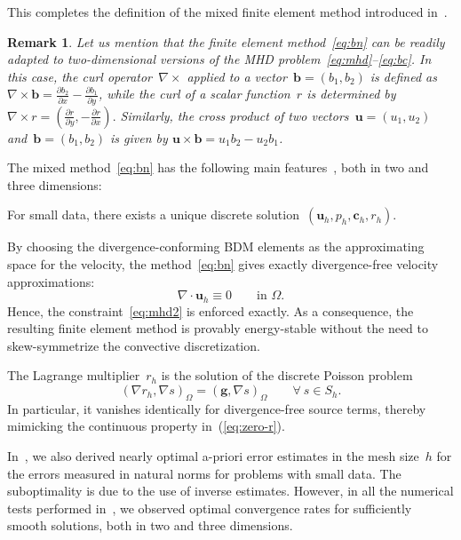 \documentclass{siamltex}
\newcounter{bean}
\newenvironment{romenum}{\begin{list}{{(\roman{bean})}}
{\usecounter{bean}}}{\end{list}}
\newtheorem{remark}[theorem]{Remark}
\newcommand{\uu}[1]{\boldsymbol #1}                     %
\begin{document}
This completes the definition of the mixed finite element method introduced in~\cite{Greif10}.

\begin{remark}
\label{remark:MHD-2D}
Let us mention that the finite element method~\eqref{eq:bn} can be readily adapted to two-dimensional versions
of the MHD problem~\eqref{eq:mhd}--\eqref{eq:bc}. In this case, the curl
operator~$\nabla\times$ applied to a vector~$\uu{b}=(b_1, b_2)$ is
defined as $\nabla \times \uu{b} = \frac{\partial b_2}{\partial
x}-\frac{\partial b_1}{\partial y}$, while the curl of a scalar
function~$r$ is determined by $\nabla \times r = (\frac{\partial
r}{\partial y}, -\frac{\partial r}{\partial x}).$ Similarly, the
cross product of two vectors~$\uu{u}=(u_1, u_2)$ and~$\uu{b}=(b_1,
b_2)$ is given by $\uu{u} \times \uu{b} = u_1b_2-u_2b_1$.
\end{remark}


The mixed method~\eqref{eq:bn} has the following main features~\cite{Greif10}, both in two and three dimensions:
\begin{romenum}
\item For small data, there exists a unique discrete solution~$(\uu{u}_h,p_h,\uu{c}_h,r_h)$.
\item  By choosing the divergence-conforming BDM elements as the
approximating space for the velocity, the method~\eqref{eq:bn} gives exactly
divergence-free velocity approximations:
\begin{equation}
\label{eq:div-free}
\nabla\cdot\uu{u}_h \equiv 0\qquad\text{in $\Omega$.}
\end{equation}
Hence, the constraint~\eqref{eq:mhd2} is enforced exactly. As a consequence,
the resulting finite element method is provably energy-stable without the need to skew-symmetrize the convective
discretization.

\item The Lagrange multiplier~$r_h$ is the solution of the discrete Poisson problem
$$
(\nabla r_h, \nabla s)_\Omega= (\uu{g}, \nabla s)_\Omega  \qquad\forall\: s\in S_h.
$$
In particular, it vanishes identically for divergence-free source
terms, thereby mimicking the continuous property
in~(\ref{eq:zero-r}).


\end{romenum}

In~\cite{Greif10}, we also derived nearly optimal a-priori error estimates in the mesh size~$h$
for the errors measured in natural norms for problems with small data. The suboptimality is due to the use of inverse estimates. However, in all
the numerical tests performed in~\cite{Greif10}, we observed optimal convergence rates for
sufficiently smooth solutions, both in two and three dimensions.
\end{document}
